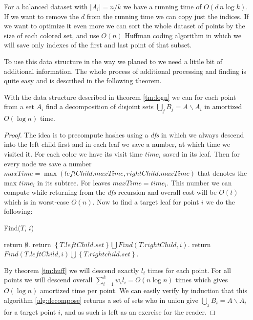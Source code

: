 \documentclass[a4paper,UKenglish,cleveref, autoref, thm-restate]{lipics-v2021}
\begin{document}
\begin{remark} For a balanced dataset with $|A_i| = n/k$ we have a running time of $O\left(d\,n \log k\right)$.
If we want to remove the $d$ from the running time we can copy just the indices.
If we want to optimize it even more we can sort the whole dataset of points by the size of each colored set, and use $O(n)$ Huffman coding algorithm in which we will save only indexes of the first and last point of that subset.
\end{remark}
To use this data structure in the way we planed to we need a little bit of additional information.
The whole process of additional processing and finding is quite easy and is described in the following theorem.
\begin{theorem}\label{tm:decompose}
With the data structure described in theorem \ref{tm:logn} we can for each point from a set $A_i$ find a decomposition of disjoint sets $\bigcup\limits_j B_j = A \backslash A_i$ in amortized $O(\log n)$ time.
\end{theorem}
\begin{proof}
The idea is to precompute hashes using a {\it dfs} in which we always descend into the left child first and in each leaf we save a number, at which time we visited it.
For each color we have its visit time $time_i$ saved in its leaf.
Then for every node we save a number $maxTime = \max \left(leftChild.maxTime, rightChild.maxTime\right)$ that denotes the max $time_i$ in its subtree.
For leaves $maxTime = time_i$.
This number we can compute while returning from the {\it dfs} recursion and overall cost will be $O(t)$ which is in worst-case $O(n)$.
Now to find a target leaf for point $i$ we do the following:
\begin{algorithm}
\caption{Find($T$, $i$)}\label{alg:decompose}
\begin{algorithmic}
    \State return $\emptyset$.
    \State return $\left\{T.leftChild.set \right\} \bigcup Find\left(T.rightChild,i\right)$.
    \Else
    \State return $Find\left(T.leftChild, i\right) \bigcup \left\{T.rightchild.set\right\}$.
    \EndIf
\end{algorithmic}
\end{algorithm}

By theorem \ref{tm:huff} we will descend exactly $l_i$ times for each point.
For all points we will descend overall
$\sum \limits_{i = 1}^k w_il_i = O\left(n \log n\right)$ times which gives $O(\log n)$ amortized time per point.
We can easily verify by induction that this algorithm \ref{alg:decompose} returns a set of sets who in union give $\bigcup\limits_j B_i = A \backslash A_i$ for a target point $i$, and as such is left as an exercise for the reader.
\end{proof}
\end{document}
